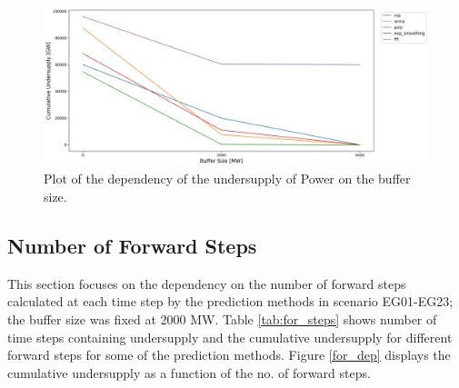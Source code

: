 \documentclass[11pt,letterpaper]{article}
\begin{document}
\begin{figure}[h!]
	\centering
	\includegraphics[width=\linewidth]{23-buff.png}
	\caption{Plot of the dependency of the undersupply of Power on the buffer size.}
	\label{buffer_dep}
\end{figure}

\subsection{Number of Forward Steps}

This section focuses on the dependency on the number of forward steps calculated at each time step by the prediction methods in scenario EG01-EG23; the buffer size was fixed at 2000 MW. Table \ref{tab:for_steps} shows number of time steps containing undersupply and the cumulative undersupply for different forward steps for some of the prediction methods. Figure \ref{for_dep} displays the cumulative undersupply as a function of the no. of forward steps.
\end{document}
